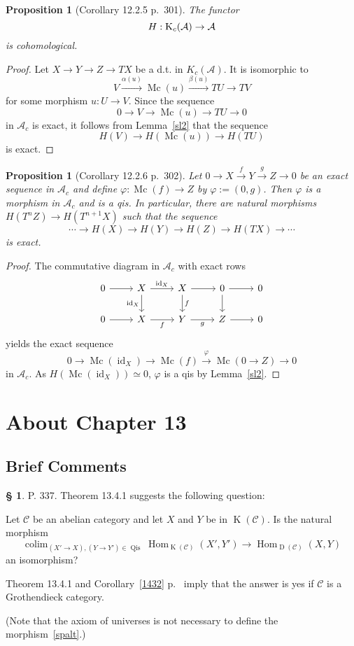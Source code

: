 \documentclass[12pt]{article}%
\newtheorem{prop}[thm]{Proposition}
\theoremstyle{remark}
\theoremstyle{definition}
\newtheorem{s}[thm]{\S}%
\newcommand{\oo}{\operatorname}
\newcommand{\A}{\mathcal A}
\newcommand{\C}{\mathcal C}
\newcommand{\xr}{\xrightarrow}
\DeclareMathOperator*{\colim}{colim}
\DeclareMathOperator{\id}{id}
\DeclareMathOperator{\Hom}{Hom}%
\DeclareMathOperator{\Mc}{Mc}
\begin{document}
\begin{prop}[Corollary 12.2.5 p.~301]\label{sl3}
The functor 
$$
H:\text K_c(\A)\to\A
$$ 
is cohomological.  
\end{prop}

\begin{proof}
Let $X\to Y\to Z\to TX$ be a d.t. in $K_c(\A)$. It is isomorphic to 
$$
V\xr{\alpha(u)}\Mc(u)\xr{\beta(u)}TU\to TV
$$ 
for some morphism $u:U\to V$. Since the sequence 
$$
0\to V\to\Mc(u)\to TU\to0
$$ 
in $\A_c$ is exact, it follows from Lemma~\ref{sl2} that the sequence 
$$ 
H(V)\to H(\Mc(u))\to H(TU)
$$ 
is exact.
\end{proof}
%
\begin{prop}[Corollary 12.2.6 p.~302]\label{sl4}
Let $0\to X\xr f Y\xr g Z\to0$ be an exact sequence in $\A_c$ and define $\varphi:\Mc(f)\to Z$ by $\varphi:=(0,g)$. Then $\varphi$ is a morphism in $\A_c$ and is a qis. In particular, there are natural morphisms $H(T^nZ)\to H(T^{n+1}X)$ such that the sequence 
$$
\cdots\to H(X)\to H(Y)\to H(Z)\to H(TX)\to\cdots
$$
is exact. 
\end{prop}

\begin{proof}
The commutative diagram in $\A_c$ with exact rows 
$$
\begin{tikzcd}
0\ar{r}&X\ar{d}[swap]{\id_X}\ar{r}{\id_X}&X\ar{d}{f}\ar{r}&0\ar{d}\ar{r}&0\\ 
0\ar{r}&X\ar{r}[swap]{f}&Y\ar{r}[swap]{g}&Z\ar{r}&0
\end{tikzcd}
$$ 
yields the exact sequence 
$$
0\to\Mc(\id_X)\to\Mc(f)\xr\varphi\Mc(0\to Z)\to0
$$
in $\A_c$. As $H(\Mc(\id_X))\simeq0$, $\varphi$ is a qis by Lemma~\ref{sl2}.
\end{proof}


\section{About Chapter 13}

\subsection{Brief Comments}

\begin{s}\label{q337}
P. 337. Theorem 13.4.1 suggests the following question: 

Let $\C$ be an abelian category and let $X$ and $Y$ be in $\oo K(\C)$. Is the natural morphism 
%
\begin{equation}\label{spalt}
\colim_{(X'\to X),(Y\to Y')\in\oo{Qis}}\Hom_{\oo K(\C)}(X',Y')\to\Hom_{\oo D(\C)}(X,Y)
\end{equation}
%
an isomorphism?

Theorem 13.4.1 and Corollary~\ref{1432} p.~\pageref{1432} imply that the answer is yes if $\C$ is a Grothendieck category. 

(Note that the axiom of universes is not necessary to define the morphism~\eqref{spalt}.)
\end{s}
\end{document}
